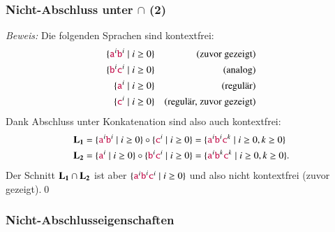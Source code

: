 \documentclass[aspectratio=1610,onlymath]{beamer}
\begin{document}
\begin{frame}\frametitle{Nicht-Abschluss unter $\cap$ (2)}


\emph{Beweis:} Die folgenden Sprachen sind kontextfrei:
\begin{align*}
\{\Sterm{a}^i\Sterm{b}^i\mid i\geq 0\} && \text{(zuvor gezeigt)}\\
\{\Sterm{b}^i\Sterm{c}^i\mid i\geq 0\} && \text{(analog)}\\
\{\Sterm{a}^i\mid i\geq 0\} && \text{(regulär)}\\
\{\Sterm{c}^i\mid i\geq 0\} && \text{(regulär, zuvor gezeigt)}
\end{align*}\pause
% 
Dank Abschluss unter Konkatenation sind also auch kontextfrei:
\begin{align*}
\Slangsub{L}{1}&=\{\Sterm{a}^i\Sterm{b}^i\mid i\geq 0\}\circ \{\Sterm{c}^i\mid i\geq 0\} = \{\Sterm{a}^i\Sterm{b}^i\Sterm{c}^k\mid i\geq 0, k\geq 0\}\\
\Slangsub{L}{2}&=\{\Sterm{a}^i\mid i\geq 0\}\circ \{\Sterm{b}^i\Sterm{c}^i\mid i\geq 0\} = \{\Sterm{a}^i\Sterm{b}^k\Sterm{c}^k\mid i\geq 0, k\geq 0\}.
\end{align*}\pause
Der Schnitt $\Slangsub{L}{1}\cap\Slangsub{L}{2}$ ist aber $\{\Sterm{a}^i\Sterm{b}^i\Sterm{c}^i\mid i\geq 0\}$ und
also nicht kontextfrei (zuvor gezeigt).\qed


\end{frame}

\begin{frame}\frametitle{Nicht-Abschlusseigenschaften}


\end{frame}
\end{document}
